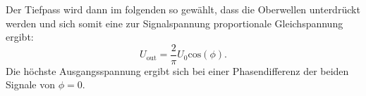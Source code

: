 Der Tiefpass wird dann im folgenden so gewählt, dass die Oberwellen unterdrückt werden und sich somit eine zur Signalspannung proportionale Gleichspannung ergibt:
\begin{equation*}
U_{\text{out}} = \frac{2}{\pi}U_{0}\text{cos}(\phi).
\end{equation*}
Die höchste Ausgangsspannung ergibt sich bei einer Phasendifferenz der beiden Signale von $\phi = 0 $.